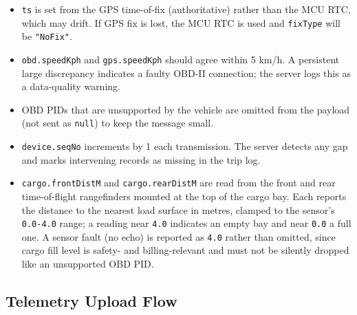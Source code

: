 \documentclass{article}
\begin{document}
\begin{itemize}
    \item \texttt{ts} is set from the GPS time-of-fix (authoritative) rather than
          the MCU RTC, which may drift. If GPS fix is lost, the MCU RTC is used
          and \texttt{fixType} will be \texttt{"NoFix"}.
    \item \texttt{obd.speedKph} and \texttt{gps.speedKph} should agree within
          5 km/h. A persistent large discrepancy indicates a faulty OBD-II
          connection; the server logs this as a data-quality warning.
    \item OBD PIDs that are unsupported by the vehicle are omitted from the
          payload (not sent as \texttt{null}) to keep the message small.
    \item \texttt{device.seqNo} increments by 1 each transmission. The server
          detects any gap and marks intervening records as missing in the trip log.
    \item \texttt{cargo.frontDistM} and \texttt{cargo.rearDistM} are read from
          the front and rear time-of-flight rangefinders mounted at the top of
          the cargo bay. Each reports the distance to the nearest load surface
          in metres, clamped to the sensor's \texttt{0.0-4.0} range; a reading
          near \texttt{4.0} indicates an empty bay and near \texttt{0.0} a full one.
          A sensor fault (no echo) is reported as \texttt{4.0} rather than omitted,
          since cargo fill level is safety- and billing-relevant and must not be
          silently dropped like an unsupported OBD PID.
\end{itemize}

\subsection{Telemetry Upload Flow}
\end{document}
